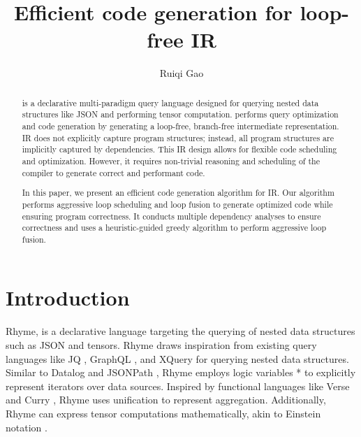 \documentclass[sigplan, nonacm]{acmart}\settopmatter{printfolios=true,printccs=false,printacmref=false}
\newcommand{\rhyme}{\text{Rhyme}\xspace}
\begin{document}
\sloppy

\title{Efficient code generation for loop-free IR}

\author{Ruiqi Gao}

\begin{abstract}
  \rhyme is a declarative multi-paradigm query language designed for querying nested data structures like JSON and performing tensor computation. \rhyme performs query optimization and code generation by generating a loop-free, branch-free intermediate representation. \rhyme IR does not explicitly capture program structures; instead, all program structures are implicitly captured by dependencies. This IR design allows for flexible code scheduling and optimization. However, it requires non-trivial reasoning and scheduling of the compiler to generate correct and performant code.\par

  In this paper, we present an efficient code generation algorithm for \rhyme IR. Our algorithm performs aggressive loop scheduling and loop fusion to generate optimized code while ensuring program correctness. It conducts multiple dependency analyses to ensure correctness and uses a heuristic-guided greedy algorithm to perform aggressive loop fusion.
\end{abstract}


\maketitle

\section{Introduction}
Rhyme\cite{abeysinghe2024rhyme, abeysingherhyme}, is a declarative language targeting the querying of nested data structures such as JSON and tensors. Rhyme draws inspiration from existing query languages like JQ \cite{jq}, GraphQL \cite{graphql}, and XQuery \cite{xquery} for querying nested data structures. Similar to Datalog \cite{datalog} and JSONPath \cite{jsonpath}, Rhyme employs logic variables * to explicitly represent iterators over data sources. Inspired by functional languages like Verse \cite{verse} and Curry \cite{curry}, Rhyme uses unification to represent aggregation. Additionally, Rhyme can express tensor computations mathematically, akin to Einstein notation \cite{einops, einsumblog, tensor_comprehensions}.
\end{document}
